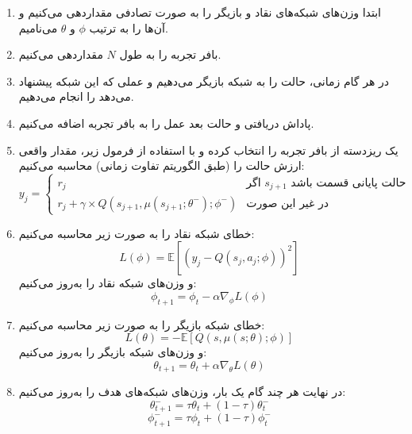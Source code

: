 \begin{enumerate}
    \item ابتدا وزن‌های شبکه‌های نقاد و بازیگر را به صورت تصادفی مقداردهی می‌کنیم و آن‌ها را به ترتیب $\phi$ و $\theta$ می‌نامیم.
    \item بافر تجربه را به طول $N$ مقداردهی می‌کنیم.
    \item در هر گام زمانی، حالت را به شبکه بازیگر می‌دهیم و عملی که این شبکه پیشنهاد می‌دهد را انجام می‌دهیم.
    \item پاداش دریافتی و حالت بعد عمل را به بافر تجربه اضافه می‌کنیم.
    \item یک ریزدسته از بافر تجربه را انتخاب کرده و با استفاده از فرمول زیر، مقدار واقعی ارزش حالت را (طبق الگوریتم تفاوت زمانی) محاسبه می‌کنیم:
    \begin{equation}\label{ddpg_label}
        y_j = \begin{cases}
            r_j & \text{اگر $s_{j+1}$ حالت پایانی قسمت باشد} \\
            r_j + \gamma \times Q(s_{j+1}, \mu(s_{j+1}; \theta^-); \phi^-) & \text{در غیر این صورت}
        \end{cases}
    \end{equation}
    \item خطای شبکه نقاد را به صورت زیر محاسبه می‌کنیم:
    \begin{equation}\label{ddpg_critic_loss}
        L(\phi) = \mathbb{E}[(y_j - Q(s_j, a_j; \phi))^2]
    \end{equation}
    و وزن‌های شبکه نقاد را به‌روز می‌کنیم:
    \begin{equation}\label{ddpg_critic_update}
        \phi_{t+1} = \phi_t - \alpha \nabla_\phi L(\phi)
    \end{equation}
    \item خطای شبکه بازیگر را به صورت زیر محاسبه می‌کنیم:
    \begin{equation}\label{ddpg_actor_loss}
        L(\theta) = -\mathbb{E}[Q(s, \mu(s; \theta); \phi)]
    \end{equation}
    و وزن‌های شبکه بازیگر را به‌روز می‌کنیم:
    \begin{equation}\label{ddpg_actor_update}
        \theta_{t+1} = \theta_t + \alpha \nabla_\theta L(\theta)
    \end{equation}
    \item در نهایت هر چند گام یک بار، وزن‌های شبکه‌های هدف را به‌روز می‌کنیم:
    \begin{equation}\label{ddpg_target_actor_update}
        \theta^-_{t+1} = \tau \theta_t + (1-\tau) \theta^-_t
    \end{equation}
    \begin{equation}\label{ddpg_target_critic_update}
        \phi^-_{t+1} = \tau \phi_t + (1-\tau) \phi^-_t
    \end{equation}
\end{enumerate}
